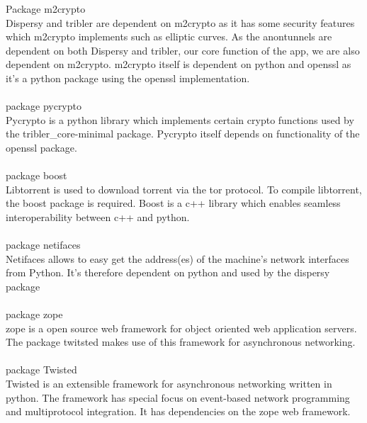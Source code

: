\documentclass{article}
\begin{document}
Package m2crypto\\

Dispersy and tribler are dependent on m2crypto as it has some security features which m2crypto implements such as elliptic curves. As the anontunnels are dependent on both Dispersy and tribler, our core function of the app, we are also dependent on m2crypto. m2crypto itself is dependent on python and openssl as it's a python package using the openssl implementation.\\\\

package pycrypto\\

Pycrypto is a python library which implements certain crypto functions used by the tribler_core-minimal package. Pycrypto itself depends on functionality of the openssl package.\\\\

package boost\\

Libtorrent is used to download torrent via the tor protocol. To compile libtorrent, the boost package is required. Boost is a c++ library which enables seamless interoperability between c++ and python. \\\\

package netifaces\\

Netifaces allows to easy get the address(es) of the machine's network interfaces from Python. It's therefore dependent on python and used by the dispersy package\\\\

package zope\\

zope is a open source web framework for object oriented web application servers. The package twitsted makes use of this framework for asynchronous networking.\\\\

package Twisted\\

Twisted is an extensible framework for asynchronous networking written in python. The framework has special focus on event-based network programming and multiprotocol integration. It has dependencies on the zope web framework.\\\\
\end{document}

